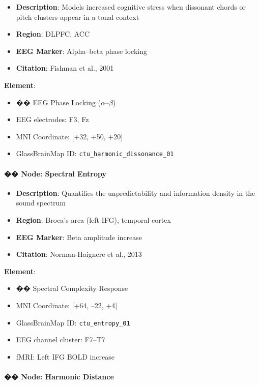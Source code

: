 \documentclass[10pt]{article}
\begin{document}
\begin{itemize}
    \item \textbf{Description}: Models increased cognitive stress when dissonant chords or pitch clusters appear in a tonal context
    \item \textbf{Region}: DLPFC, ACC
    \item \textbf{EEG Marker}: Alpha–beta phase locking
    \item \textbf{Citation}: Fishman et al., 2001
\end{itemize}

\textbf{Element}:
\begin{itemize}
    \item �� EEG Phase Locking ($\alpha$–$\beta$)
    \item EEG electrodes: F3, Fz
    \item MNI Coordinate: [+32, +50, +20]
    \item GlassBrainMap ID: \texttt{ctu\_harmonic\_dissonance\_01}
\end{itemize}

\paragraph{�� Node: Spectral Entropy}

\begin{itemize}
    \item \textbf{Description}: Quantifies the unpredictability and information density in the sound spectrum
    \item \textbf{Region}: Broca’s area (left IFG), temporal cortex
    \item \textbf{EEG Marker}: Beta amplitude increase
    \item \textbf{Citation}: Norman-Haignere et al., 2013
\end{itemize}

\textbf{Element}:
\begin{itemize}
    \item �� Spectral Complexity Response
    \item MNI Coordinate: [+64, –22, +4]
    \item GlassBrainMap ID: \texttt{ctu\_entropy\_01}
    \item EEG channel cluster: F7–T7
    \item fMRI: Left IFG BOLD increase
\end{itemize}

\paragraph{�� Node: Harmonic Distance}
\end{document}
